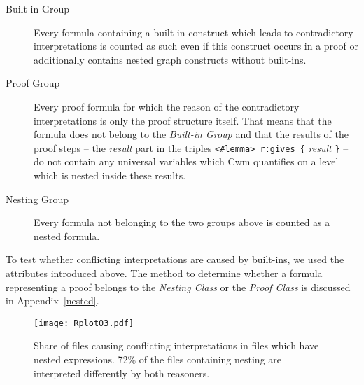 \begin{description}
\item[Built-in Group] Every formula containing a built-in construct which leads to contradictory interpretations
is counted as such even if this construct occurs in a proof or additionally contains nested graph constructs without built-ins.
\item[Proof Group]
Every proof formula for which the reason of the contradictory interpretations is only the proof structure itself. 
That means that the formula does not belong to the \emph{Built-in Group} and that the results of the proof 
steps -- \ie the \textit{result} part in the triples \texttt{<\#lemma> r:gives \{} \textit{result} \texttt{\}} -- do not contain any universal variables which 
Cwm quantifies on a level which is nested inside these results.
\item[Nesting Group]
Every formula not belonging to the two groups above is counted as a nested formula.
\end{description}

To test whether conflicting interpretations are caused by built-ins, we used the attributes introduced above. 
The method to determine whether a formula representing a proof belongs to the \emph{Nesting Class} or the \emph{Proof Class}  is discussed in Appendix~\ref{nested}. 


\begin{figure}
 \texttt{[image: Rplot03.pdf]}
 \caption{Share of files causing conflicting interpretations in
 files which have nested expressions. 72\% of the files containing nesting are interpreted differently by both reasoners.
\label{onlynests}}
\end{figure}

